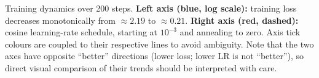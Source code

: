 \caption{Training dynamics over 200 steps. \textbf{Left axis (blue, log scale):} training loss decreases monotonically from ${\approx}2.19$ to ${\approx}0.21$. \textbf{Right axis (red, dashed):} cosine learning-rate schedule, starting at $10^{-3}$ and annealing to zero. Axis tick colours are coupled to their respective lines to avoid ambiguity. Note that the two axes have opposite ``better'' directions (lower loss; lower LR is not ``better''), so direct visual comparison of their trends should be interpreted with care.}
